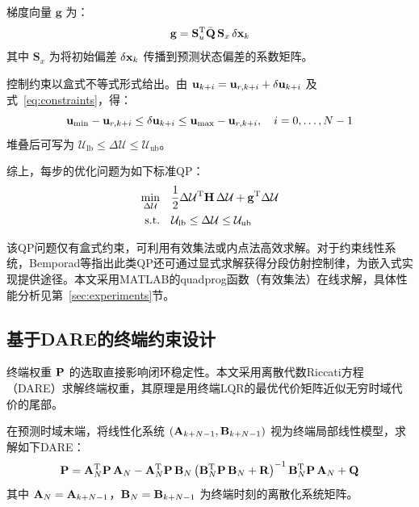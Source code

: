 梯度向量 $\mathbf{g}$ 为：
\begin{equation}\label{eq:gradient}
\mathbf{g} = \mathbf{S}_u^{\mathrm{T}} \bar{\mathbf{Q}}\, \mathbf{S}_x\, \delta\mathbf{x}_k
\end{equation}
其中 $\mathbf{S}_x$ 为将初始偏差 $\delta\mathbf{x}_k$ 传播到预测状态偏差的系数矩阵。

控制约束以盒式不等式形式给出。由 $\mathbf{u}_{k+i} = \mathbf{u}_{r,k+i} + \delta\mathbf{u}_{k+i}$ 及式~\eqref{eq:constraints}，得：
\begin{equation}\label{eq:qp_constraints}
\mathbf{u}_{\min} - \mathbf{u}_{r,k+i} \leq \delta\mathbf{u}_{k+i} \leq \mathbf{u}_{\max} - \mathbf{u}_{r,k+i}, \quad i = 0, \ldots, N-1
\end{equation}
堆叠后可写为 $\mathcal{U}_{\text{lb}} \leq \Delta\mathcal{U} \leq \mathcal{U}_{\text{ub}}$。

综上，每步的优化问题为如下标准QP：
\begin{equation}\label{eq:qp_final}
\begin{aligned}
\min_{\Delta\mathcal{U}} \quad & \frac{1}{2} \Delta\mathcal{U}^{\mathrm{T}} \mathbf{H}\, \Delta\mathcal{U} + \mathbf{g}^{\mathrm{T}} \Delta\mathcal{U} \\
\text{s.t.} \quad & \mathcal{U}_{\text{lb}} \leq \Delta\mathcal{U} \leq \mathcal{U}_{\text{ub}}
\end{aligned}
\end{equation}

该QP问题仅有盒式约束，可利用有效集法或内点法高效求解。对于约束线性系统，Bemporad等\cite{Bemporad2002}指出此类QP还可通过显式求解获得分段仿射控制律，为嵌入式实现提供途径。本文采用MATLAB的quadprog函数（有效集法）在线求解，具体性能分析见第~\ref{sec:experiments}节。

\subsection{基于DARE的终端约束设计}\label{sec:dare}

终端权重 $\mathbf{P}$ 的选取直接影响闭环稳定性。本文采用离散代数Riccati方程（DARE）求解终端权重，其原理是用终端LQR的最优代价矩阵近似无穷时域代价的尾部\cite{Mayne2000,Anderson1990}。

在预测时域末端，将线性化系统 $(\mathbf{A}_{k+N-1}, \mathbf{B}_{k+N-1})$ 视为终端局部线性模型，求解如下DARE：
\begin{equation}\label{eq:dare}
\mathbf{P} = \mathbf{A}_N^{\mathrm{T}} \mathbf{P}\, \mathbf{A}_N - \mathbf{A}_N^{\mathrm{T}} \mathbf{P}\, \mathbf{B}_N \left(\mathbf{B}_N^{\mathrm{T}} \mathbf{P}\, \mathbf{B}_N + \mathbf{R}\right)^{-1} \mathbf{B}_N^{\mathrm{T}} \mathbf{P}\, \mathbf{A}_N + \mathbf{Q}
\end{equation}
其中 $\mathbf{A}_N = \mathbf{A}_{k+N-1}$，$\mathbf{B}_N = \mathbf{B}_{k+N-1}$ 为终端时刻的离散化系统矩阵。

